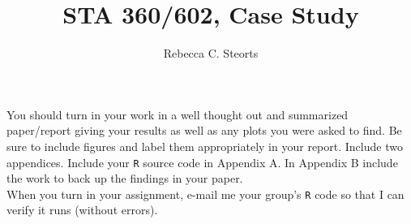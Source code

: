 \documentclass[12pt]{article}
\begin{document}
\title{STA 360/602, Case Study}
\author{Rebecca C. Steorts}
\maketitle
\setlength{\parindent}{0cm}

You should turn in your work in a well thought out and summarized paper/report giving your results as well as any plots you were asked to find. Be sure to include figures and label them appropriately in your report. Include two appendices.  Include your \texttt{R} source code in Appendix A. In Appendix B include the work to back up the findings in your paper.
\\

When you turn in your assignment, e-mail me your group's \texttt{R} code so that I can verify it runs (without errors). 
\end{document}
